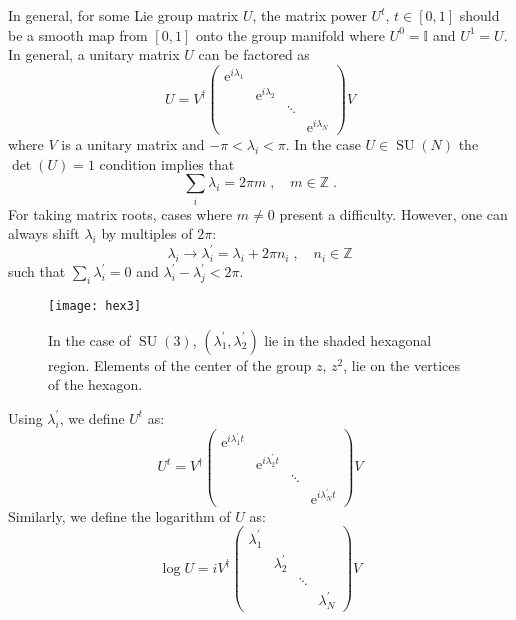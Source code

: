 \documentclass[preprint,aps]{revtex4}
\newcommand{\da}{\dagger}  %
\newcommand{\be}{\begin{equation}}
\newcommand{\eq}{\end{equation}}
\newcommand{\integer}{\mathbb{Z}}       %
\DeclareMathOperator{\SU}{SU}
\begin{document}
In general, for some Lie group matrix $U$, the matrix power
$U^t$, $t\in[0,1]$ should be a smooth map from $[0,1]$
onto the group manifold where $U^0=\mathbb{I}$ and $U^1=U$. 
In general, a unitary matrix $U$ can be factored as
%
\be
U = V^\da \begin{pmatrix}
    \mathrm{e}^{i \lambda_1} & & &\\
    & \mathrm{e}^{i \lambda_2} & &\\
    & & \ddots & \\
    & & & \mathrm{e}^{i \lambda_N}\end{pmatrix} V
\eq
%
where $V$ is a unitary matrix and $-\pi < \lambda_i < \pi$.
In the case $U \in \SU(N)$ the $\det(U)=1$ condition implies that
\be
\sum_i \lambda_i = 2 \pi m\;, \quad m\in\integer \;.
\eq
For taking matrix roots, cases where $m\neq 0$ present a
difficulty.  However, one can always shift $\lambda_i$ by
multiples of $2\pi$:
\be
\lambda_i \to \lambda_i^\prime = \lambda_i + 2 \pi n_i\;,\quad
n_i\in\integer
\eq
such that $\sum_i \lambda_i^\prime = 0$ and
$\lambda_i^\prime - \lambda_j^\prime < 2 \pi$.
%
\begin{figure}

\texttt{[image: hex3]}
  \caption{In the case of $\SU(3)$, $(\lambda_1^\prime,\lambda_2^\prime)$ lie in the shaded hexagonal region.
    Elements of the center of the group $z$, $z^2$, lie on the vertices of the hexagon.}
\end{figure}
%
Using $\lambda_i^\prime$, we define $U^t$ as:
\be
U^t = V^\da \begin{pmatrix}
    \mathrm{e}^{i\lambda_1^\prime t} & & &\\
    & \mathrm{e}^{i\lambda_2^\prime t} & &\\
    & & \ddots & \\
    & & & \mathrm{e}^{i\lambda_N^\prime t}\end{pmatrix} V
\eq
Similarly, we define the logarithm of $U$ as:
\be
\log U = i V^\da \begin{pmatrix}
    \lambda_1^\prime & & &\\
    & \lambda_2^\prime & &\\
    & & \ddots & \\
    & & & \lambda_N^\prime\end{pmatrix} V
\eq

\begin{thebibliography}{99}


\end{thebibliography}
\end{document}
